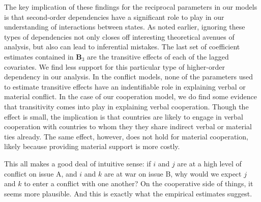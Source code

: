 \documentclass[3p,times,twocolumn,authoryear,12pt]{elsarticle}
\newcommand{\bl}[1]{{\mathbf #1}}
\begin{document}
The key implication of these findings for the reciprocal parameters in our models is that second-order dependencies have a significant role to play in our understanding of interactions between states. As noted earlier, ignoring these types of dependencies not only closes off interesting theoretical avenues of analysis, but also can lead to inferential mistakes. The last set of coefficient estimates contained in $\bl B_3$  are the transitive effects of each of the lagged covariates. We find less support for this particular type of higher-order dependency in our analysis. In the conflict models, none of the parameters used to estimate transitive effects have an indentifiable role in explaining verbal or material conflict. In the case of our cooperation model, we do find some evidence that transitivity comes into play in explaining verbal cooperation. Though the effect is small, the implication is that countries are likely to engage in verbal cooperation with countries to whom they they share indirect verbal or material ties already. The same effect, however, does not hold for material cooperation, likely because providing material support is more costly. 

This all makes a good deal of intuitive sense: if $i$ and $j$ are at a high level of conflict on issue A, and $i$ and $k$ are at war on issue B, why would we expect $j$ and $k$ to enter a conflict with one another? On the cooperative side of things, it seems more plausible. And this is exactly what the empirical estimates suggest.
\end{document}
